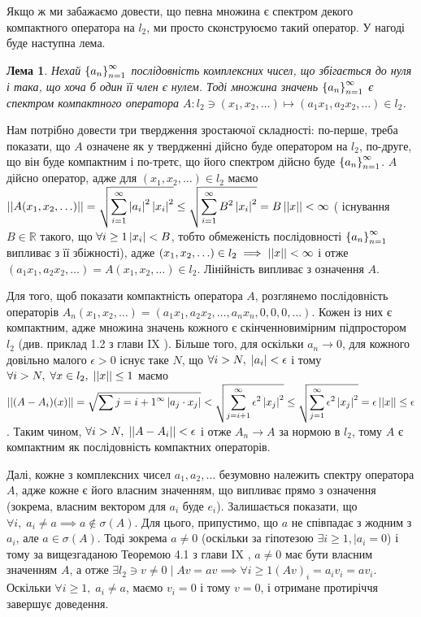 \documentclass[12pt]{article} %
\newtheorem{myulem}[theorem]{Лема}
\renewenvironment{myproof}[1][Доведення]{\begin{trivlist}
\item[\hskip \labelsep {\bfseries #1}]}{\myqed\end{trivlist}}
\begin{document}
	Якщо ж ми забажаємо довести, що певна множина є спектром декого компактного оператора на $l_2$, ми просто сконструюємо такий оператор. У 
	нагоді буде наступна лема.
	\begin{myulem}\label{CompactSpectrumLemma}
		Нехай $\left\{a_n\right\}_{n=1}^{\infty}$ послідовність комплексних чисел, що збігається до нуля і така, що хоча б один її член
		є нулем.
		Тоді множина значень $\left\{a_n\right\}_{n=1}^{\infty}$ є спектром компактного оператора
	$A:l_2\ni(x_1,x_2,\hdots)\mapsto(a_1x_1,a_2x_2,\hdots)\in l_2$.\end{myulem}
	\begin{myproof} Нам потрібно довести три твердження зростаючої складності: по-перше, треба показати, що $A$ означене як у твердженні
		дійсно буде оператором на $l_2$, 
		по-друге, що він буде компактним
		і по-третє, що його спектром дійсно буде $\left\{a_n\right\}_{n=1}^{\infty}$.
		$A$ дійсно оператор, адже для $(x_1,x_2,\hdots)\in l_2$ маємо $\mynorm{A(x_1,x_2,\hdots)}=\sqrt{\sum_{i=1}^{\infty}
		\myabs{a_i}^2\myabs{x_i}^2}\leq\sqrt{\sum_{i=1}^{\infty}B^2\myabs{x_i}^2}=B\mynorm{x}<\infty$ (
		існування $B\in\mathbb{R}$ такого, що $\forall i\geq 1 \left|x_i\right|<B$, тобто обмеженість послідовності
		$\left\{a_n\right\}_{n=1}^{\infty}$ випливає з її збіжності), адже $(x_1,x_2,\hdots)\in l_2\implies
		\left|\left|x\right|\right|<\infty$ і отже $(a_1x_1,a_2x_2,\hdots)=A(x_1,x_2,\hdots)\in l_2$. Лінійність випливає з означення $A$.
		
		Для того, щоб показати компактність оператора $A$, розглянемо послідовність операторів $A_n(x_1,x_2,\dots)=(a_1x_1,a_2x_2,\dots,
		a_nx_n,0,0,0,\dots)$. Кожен із них є компактним, адже множина значень кожного є скінченновимірним підпростором $l_2$ (див. приклад
		1.2 з глави IX \cite{tb}). Більше того, для оскільки $a_n\to0$, для кожного довільно малого $\epsilon>0$ існує таке $N$,
		що $\forall i>N,\;\left|a_i\right|<\epsilon$ і тому $\forall i>N,\;\forall x\in l_2,\;\left|\left|x\right|\right|\leq1$ маємо $\mynorm{(A-A_i)(x)}=
		\sqrt{\sum{j=i+1}^{\infty}\myabs{a_j\cdot x_j}}<\sqrt{\sum_{j=i+1}^{\infty}\epsilon^2\myabs{x_j}^2}\leq
		\sqrt{\sum_{j=1}^{\infty}\epsilon^2\myabs{x_j}^2}=\epsilon\mynorm{x}\leq\epsilon$. Таким чином, $\forall i>N,\;\left|\left|A-A_i\right|\right|<
		\epsilon$ і отже $A_n\to A$ за нормою в $l_2$, тому $A$ є компактним як послідовність компактних операторів.

		Далі, кожне з комплексних чисел $a_1,a_2,\hdots$ безумовно належить спектру оператора $A$, адже кожне є його власним значенням,
		що випливає прямо з означення (зокрема, власним вектором для $a_i$ буде $e_i$). Залишається показати, що $\forall i,\;a_i\neq a\implies a\notin\sigma(A)$.
		Для цього, припустимо, що $a$ не співпадає з жодним з $a_i$, але $a\in\sigma(A)$.
		Тоді зокрема $a\neq 0$ (оскільки за гіпотезою $\exists i\geq 1,\mid a_i=0$) і тому за вищезгаданою Теоремою 4.1 з
		глави IX \cite{tb}, $a\neq0$ має бути власним значенням $A$, а отже $\exists l_2\ni v\neq0\mid Av=av\implies\forall i\geq 1
		(Av)_i=a_iv_i=av_i$. Оскільки $\forall i\geq 1,\;a_i\neq a$, маємо $v_i=0$ і тому $v=0$, і отримане протиріччя завершує доведення.
	\end{myproof}
\end{document}
